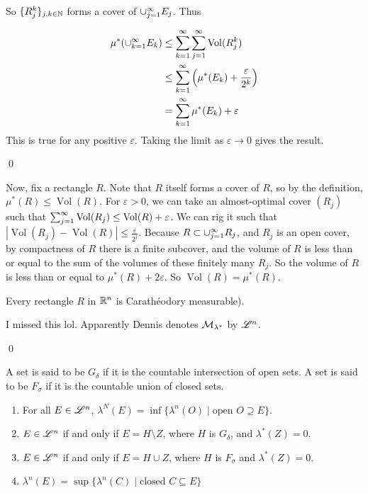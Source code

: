 \documentclass[x11names,reqno,14pt]{extarticle}
\newcommand{\seq}[2][\oo]{_{#2 = 1}^#1}
\DeclareMathOperator{\Vol}{Vol}
\begin{document}
So $\{R^k_j\}_{j, k \in \mathbb{N}}$ forms a cover of $\cup\seq{j}E_j$. Thus

\begin{align*}
\mu^*(\cup\seq{k}E_k) & \leq \sum\seq{k}\sum\seq{j}\Vol(R_j^k) \\
& \leq \sum\seq{k}\left(\mu^*(E_k) + \frac{\varepsilon}{2^k}\right) \\
& = \sum\seq{k}\mu^*(E_k) + \varepsilon
\end{align*}
This is true for any positive $\varepsilon$. Taking the limit as $\varepsilon\to0$ gives the result. 

\qed

Now, fix a rectangle $R$. Note that $R$ itself forms a cover of $R$, so by the definition, $\mu^*(R) \leq \Vol(R)$. For $\varepsilon > 0$, we can take an almost-optimal cover $(R_j)$ such that $\sum\seq{j}\Vol(R_j) \leq \Vol(R) + \varepsilon$. We can rig it such that $|\Vol(R_j) - \Vol(R)| \leq \frac{\varepsilon}{2^j}$.  Because $R \subset\cup\seq{j}R_j$, and $R_j$ is an open cover, by compactness of $R$ there is a finite subcover, and the volume of $R$ is less than or equal to the sum of the volumes of these finitely many $R_j$. So the volume of $R$ is less than or equal to $\mu^*(R) + 2\varepsilon$. So $\Vol(R) = \mu^*(R)$.

\prop 

Every rectangle $R$ in $\mathbb{R}^n$ is Carath\'eodory measurable). 

\proof

I missed this lol. Apparently Dennis denotes $\mathcal{M}_{\lambda^*}$ by $\mathscr{L}^n$.

\qed


A set is said to be \underline{$G_\delta$} if it is the countable intersection of open sets. A set is said to be \underline{$F_\sigma$} if it is the countable union of closed sets. 

\thm

\begin{enumerate}

\item For all $E \in \mathscr{L}^n$, $\lambda^N(E) = \inf\{\lambda^n(O) \mid \text{open }O\supseteq E\}$. 

\item $E \in \mathscr{L}^n$ if and only if $E = H\setminus Z$, where $H$ is $G_\delta$, and $\lambda^*(Z) = 0$. 

\item $E \in \mathscr{L}^n$ if and only if $E = H \cup Z$, where $H$ is $F_\sigma$ and $\lambda^*(Z) = 0$. 

\item $\lambda^n(E) = \sup\{\lambda^n(C) \mid \text{closed }C \subseteq E\}$

\end{enumerate}
\end{document}
